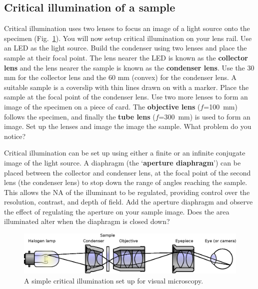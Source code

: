 \documentclass[a4paper]{report}
\begin{document}
\subsection{Critical illumination of a sample}
Critical illumination uses two lenses to focus an image of a light
source onto the specimen (Fig.~\ref{critIlum}). You will now setup
critical illumination on your lens rail. Use an LED as the light
source. Build the condenser using two lenses and place the sample at
their focal point. The lens nearer the LED is known as the
\textbf{collector lens} and the lens nearer the sample is known as the
\textbf{condenser lens}. Use the 30 mm for the collector lens and the
60 mm (convex) for the condenser lens. A suitable sample is a
coverslip with thin lines drawn on with a marker. Place the sample at
the focal point of the condenser lens. Use two more lenses to form an
image of the specimen on a piece of card. The \textbf{objective lens}
($f$=100~mm) follows the specimen, and finally the \textbf{tube lens}
($f$=300~mm) is used to form an image. Set up the lenses and image the
image the sample. What problem do you notice?

Critical illumination can be set up using either a finite or an
infinite conjugate image of the light source. A diaphragm (the
`\textbf{aperture diaphragm}') can be placed between the collector and
condenser lens, at the focal point of the second lens (the condenser
lens) to stop down the range of angles reaching the sample. This
allows the NA of the illuminant to be regulated, providing control
over the resolution, contrast, and depth of field. Add the aperture
diaphragm and observe the effect of regulating the aperture on your
sample image. Does the area illuminated alter when the diaphragm is
closed down?

\begin{figure}[h]
\center
\includegraphics[width=5in]{Critical_Illumination.eps}
\caption{A simple critical illumination set up for visual microscopy.}
\label{critIlum}
\end{figure}
\end{document}
